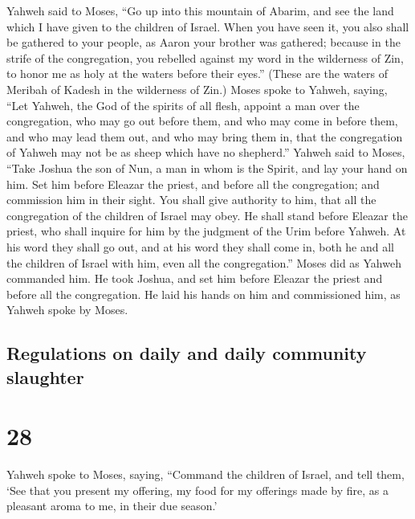  Yahweh said to Moses, ``Go up into this mountain of
Abarim, and see the land which I have given to the children of Israel.
 When you have seen it, you also shall be gathered to
your people, as Aaron your brother was gathered;  because
in the strife of the congregation, you rebelled against my word in the
wilderness of Zin, to honor me as holy at the waters before their
eyes.'' (These are the waters of Meribah of Kadesh in the wilderness of
Zin.)  Moses spoke to Yahweh, saying, 
``Let Yahweh, the God of the spirits of all flesh, appoint a man over
the congregation,  who may go out before them, and who
may come in before them, and who may lead them out, and who may bring
them in, that the congregation of Yahweh may not be as sheep which have
no shepherd.''  Yahweh said to Moses, ``Take Joshua the
son of Nun, a man in whom is the Spirit, and lay your hand on him.
 Set him before Eleazar the priest, and before all the
congregation; and commission him in their sight.  You
shall give authority to him, that all the congregation of the children
of Israel may obey.  He shall stand before Eleazar the
priest, who shall inquire for him by the judgment of the Urim before
Yahweh. At his word they shall go out, and at his word they shall come
in, both he and all the children of Israel with him, even all the
congregation.''  Moses did as Yahweh commanded him. He
took Joshua, and set him before Eleazar the priest and before all the
congregation.  He laid his hands on him and commissioned
him, as Yahweh spoke by Moses.

\hypertarget{regulations-on-daily-and-daily-community-slaughter}{%
\subsection{Regulations on daily and daily community
slaughter}\label{regulations-on-daily-and-daily-community-slaughter}}

\hypertarget{section-27}{%
\section{28}\label{section-27}}

 Yahweh spoke to Moses, saying,  ``Command
the children of Israel, and tell them, `See that you present my
offering, my food for my offerings made by fire, as a pleasant aroma to
me, in their due season.'

